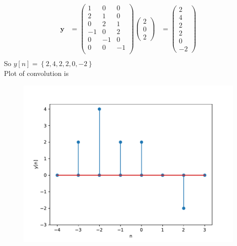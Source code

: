 \documentclass[journal,12pt,twocolumn]{IEEEtran}
\providecommand{\cbrak}[1]{\ensuremath{\left\{#1\right\}}}
\providecommand{\sbrak}[1]{\ensuremath{\left[#1\right]}}
\let\vec\mathbf
\numberwithin{equation}{section}
\newcommand{\myvec}[1]{\ensuremath{\begin{pmatrix}#1\end{pmatrix}}}
\begin{document}
\begin{enumerate}[label=\arabic*]
\begin{figure}[!ht]
\label{fig:h[n]}
\end{figure}
\begin{align}
\vec{y}&=\myvec{1 & 0&0\\ 2& 1&0\\ 0& 2&1\\-1 & 0&2\\0 & -1&0\\0& 0&-1\\}\myvec{2 \\ 0 \\2}
&=\myvec{2\\4\\2\\2\\0\\-2}\\
\end{align}
So $y\sbrak{n}=\cbrak{2,4,2,2,0,-2}$\\
Plot of convolution is 
\begin{figure}[!ht]
\centering
\includegraphics[width=\columnwidth]{./figs/y[n]}
\label{fig:y[n]}
\end{figure}
\end{enumerate} 
 
\end{document}
